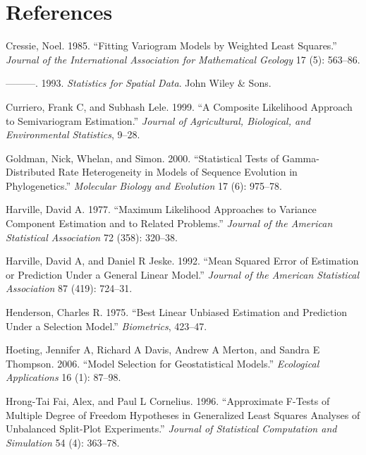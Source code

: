 \documentclass{article}
\begin{document}
\hypertarget{references}{%
\section*{References}\label{references}}

\hypertarget{refs}{}
\leavevmode\hypertarget{ref-cressie1985fitting}{}%
Cressie, Noel. 1985. ``Fitting Variogram Models by Weighted Least
Squares.'' \emph{Journal of the International Association for
Mathematical Geology} 17 (5): 563--86.

\leavevmode\hypertarget{ref-cressie1993statistics}{}%
---------. 1993. \emph{Statistics for Spatial Data}. John Wiley \& Sons.

\leavevmode\hypertarget{ref-curriero1999composite}{}%
Curriero, Frank C, and Subhash Lele. 1999. ``A Composite Likelihood
Approach to Semivariogram Estimation.'' \emph{Journal of Agricultural,
Biological, and Environmental Statistics}, 9--28.

\leavevmode\hypertarget{ref-goldman2000statistical}{}%
Goldman, Nick, Whelan, and Simon. 2000. ``Statistical Tests of
Gamma-Distributed Rate Heterogeneity in Models of Sequence Evolution in
Phylogenetics.'' \emph{Molecular Biology and Evolution} 17 (6): 975--78.

\leavevmode\hypertarget{ref-harville1977maximum}{}%
Harville, David A. 1977. ``Maximum Likelihood Approaches to Variance
Component Estimation and to Related Problems.'' \emph{Journal of the
American Statistical Association} 72 (358): 320--38.

\leavevmode\hypertarget{ref-harville1992mean}{}%
Harville, David A, and Daniel R Jeske. 1992. ``Mean Squared Error of
Estimation or Prediction Under a General Linear Model.'' \emph{Journal
of the American Statistical Association} 87 (419): 724--31.

\leavevmode\hypertarget{ref-henderson1975best}{}%
Henderson, Charles R. 1975. ``Best Linear Unbiased Estimation and
Prediction Under a Selection Model.'' \emph{Biometrics}, 423--47.

\leavevmode\hypertarget{ref-hoeting2006model}{}%
Hoeting, Jennifer A, Richard A Davis, Andrew A Merton, and Sandra E
Thompson. 2006. ``Model Selection for Geostatistical Models.''
\emph{Ecological Applications} 16 (1): 87--98.

\leavevmode\hypertarget{ref-hrong1996approximate}{}%
Hrong-Tai Fai, Alex, and Paul L Cornelius. 1996. ``Approximate F-Tests
of Multiple Degree of Freedom Hypotheses in Generalized Least Squares
Analyses of Unbalanced Split-Plot Experiments.'' \emph{Journal of
Statistical Computation and Simulation} 54 (4): 363--78.
\end{document}
